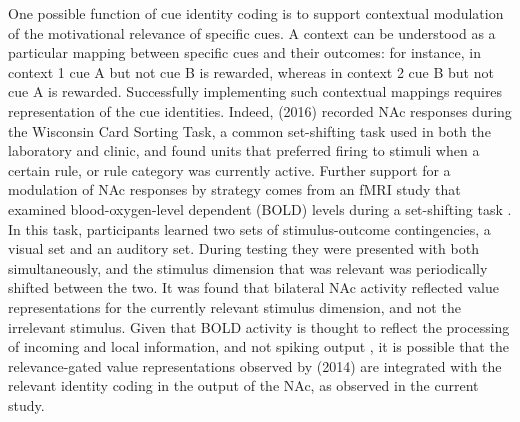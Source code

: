 \documentclass[11pt]{article}
\let\cite=\citep
\providecommand{\DIFadd}[1]{{\protect\color{red} \sf #1}} %
\providecommand{\DIFaddbegin}{} %
\providecommand{\DIFaddend}{} %
\newcommand{\DIFaddincludegraphics}[2][]{{\color{red}\fbox{\DIFOincludegraphics[#1]{#2}}}} %
\DeclareRobustCommand{\DIFaddbegin}{\DIFOaddbegin \let\includegraphics\DIFaddincludegraphics} %
\DeclareRobustCommand{\DIFaddend}{\DIFOaddend \let\includegraphics\DIFOincludegraphics} %
\begin{document}
\DIFaddbegin \DIFadd{One possible function of }\DIFaddend cue identity coding is to support contextual
modulation of the motivational relevance of specific cues. A context
can be understood as a particular mapping between specific cues and
their outcomes: for instance, in context 1 cue A but not cue B is
rewarded, whereas in context 2 cue B but not cue A is
rewarded. Successfully implementing such contextual mappings requires
representation of the cue identities. Indeed, \citeauthor{Sleezer2016}
(2016) recorded NAc responses during the Wisconsin Card Sorting Task,
a common set-shifting task used in both the laboratory and clinic, and
found units that preferred firing to stimuli when a certain rule, or
rule category was currently active. Further support for a modulation
of NAc responses by strategy comes from an fMRI study that examined
blood-oxygen-level dependent (BOLD) levels during a set-shifting task
\cite{Fitzgerald2014}. In this task, participants learned two sets of
stimulus-outcome contingencies, a visual set and an auditory
set. During testing they were presented with both simultaneously, and
the stimulus dimension that was relevant was periodically shifted
between the two. It was found that bilateral NAc activity reflected
value representations for the currently relevant stimulus dimension,
and not the irrelevant stimulus. \DIFaddbegin \DIFadd{Given that BOLD activity is thought
to reflect the processing of incoming and local information, and not
spiking output \cite{Logothetis2001}, it is possible that the
relevance-gated value representations observed by
\citeauthor{Fitzgerald2014} (2014) are integrated with the relevant
identity coding in the output of the NAc, as observed in the current
study.
}
\end{document}
